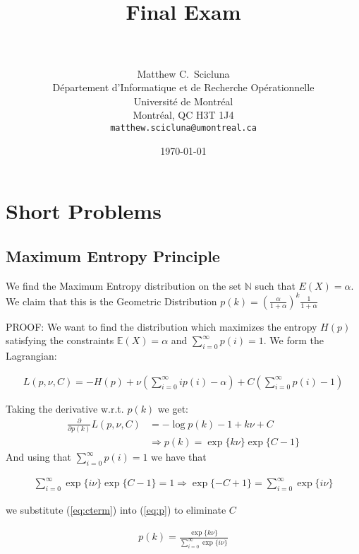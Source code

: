 \documentclass[paper=a4, fontsize=11pt]{scrartcl} %
\title{	
\normalfont \normalsize 
\horrule{0.5pt} \\[0.4cm] %
\huge Final Exam \\ %
\horrule{2pt} \\[0.5cm] %
}
\author{
	Matthew C.~Scicluna\\
	D\'epartement d'Informatique et de Recherche Op\'erationnelle\\
	Universit\'e de Montr\'eal\\
	Montr\'eal, QC H3T 1J4 \\
	\texttt{matthew.scicluna@umontreal.ca}
}
\date{\normalsize\today} %
\numberwithin{equation}{section} %
\numberwithin{figure}{section} %
\numberwithin{table}{section} %
\begin{document}
\maketitle %


\section{Short Problems}

\subsection{Maximum Entropy Principle}

We find the Maximum Entropy distribution on the set $\mathbb{N}$ such that $E(X)=\alpha$. We claim that this is the Geometric Distribution $p(k)=\left(\frac{\alpha}{1+\alpha}\right)^k \frac{1}{1+\alpha}$

PROOF:
We want to find the distribution which maximizes the entropy $H(p)$ satisfying the constraints $\mathbb{E}(X)=\alpha$ and $\sum_{i=0}^{\infty}p(i)=1$. We form the Lagrangian:

\begin{align*}
L(p,\nu, C)=-H(p)+\nu \left(\sum_{i=0}^{\infty} ip(i)-\alpha\right) + C\left( \sum_{i=0}^{\infty}p(i)-1 \right)
\end{align*}

Taking the derivative w.r.t. $p(k)$ we get:
\begin{align}\label{eq:p}
\frac{\partial}{\partial p(k)}L(p,\nu, C)&= -\log p(k) - 1 + k\nu + C\\
&\Rightarrow p(k) = \exp\{k\nu\}\exp\{C-1\}
\end{align}
And using that $\sum_{i=0}^{\infty}p(i)=1$ we have that

\begin{align}\label{eq:cterm}
\sum_{i=0}^{\infty}\exp\{i\nu\}\exp\{C-1\}
= 1 \Rightarrow \exp\{-C+1\} = \sum_{i=0}^{\infty}\exp\{i\nu\}
\end{align}

we substitute (\ref{eq:cterm}) into (\ref{eq:p}) to eliminate $C$

\begin{align}\label{eq:pnoc}
p(k)=\frac{\exp\{k\nu\}}{\sum_{i=0}^{\infty}\exp\{i\nu\}}
\end{align}
\end{document}

